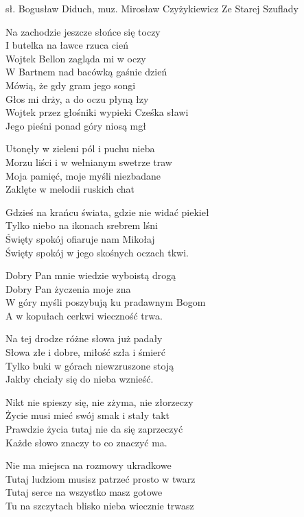 {sł. Bogusław Diduch, muz. Mirosław Czyżykiewicz}
{Ze Starej Szuflady}
\begin{text}
\hfill\break
\vin Na zachodzie jeszcze słońce się toczy\\
\vin I butelka na ławce rzuca cień\\
\vin Wojtek Bellon zagląda mi w oczy\\
\vin W Bartnem nad bacówką gaśnie dzień\\
\vin Mówią, że gdy gram jego songi\\
\vin Głos mi drży, a do oczu płyną łzy\\
\vin Wojtek przez głośniki wypieki Cześka sławi\\
\vin Jego pieśni ponad góry niosą mgł

Utonęły w zieleni pól i puchu nieba\\
Morzu liści i w wełnianym swetrze traw\\
Moja pamięć, moje myśli niezbadane\\
Zaklęte w melodii ruskich chat

Gdzieś na krańcu świata, gdzie nie widać piekieł\\
Tylko niebo na ikonach srebrem lśni\\
Święty spokój ofiaruje nam Mikołaj\\
Święty spokój w jego skośnych oczach tkwi.

\hfill\break
\vin Dobry Pan mnie wiedzie wyboistą drogą\\
\vin Dobry Pan życzenia moje zna\\
\vin W góry myśli poszybują ku pradawnym Bogom\\
\vin A w kopułach cerkwi wieczność trwa.

\vin Na tej drodze różne słowa już padały\\
\vin Słowa złe i dobre, miłość szła i śmierć\\
\vin Tylko buki w górach niewzruszone stoją\\
\vin Jakby chciały się do nieba wznieść.

Nikt nie spieszy się, nie zżyma, nie złorzeczy\\
Życie musi mieć swój smak i stały takt\\
Prawdzie życia tutaj nie da się zaprzeczyć\\
Każde słowo znaczy to co znaczyć ma.

Nie ma miejsca na rozmowy ukradkowe\\
Tutaj ludziom musisz patrzeć prosto w twarz\\
Tutaj serce na wszystko masz gotowe\\
Tu na szczytach blisko nieba wiecznie trwasz
\end{text}
